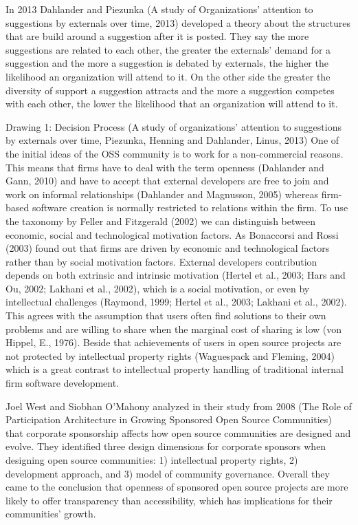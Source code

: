 In 2013 Dahlander and Piezunka (A study of Organizations’ attention to suggestions by externals over time, 2013) developed a theory about the structures that are build around a suggestion after it is posted. They say the more suggestions are related to each other, the greater the externals’ demand  for a suggestion and the more a suggestion is debated by externals, the higher the likelihood an organization will attend to it. On the other side the greater the diversity of support a suggestion attracts and the more a suggestion competes with each other, the lower the likelihood that an organization will attend to it.


Drawing 1: Decision Process (A study of organizations' attention to suggestions by externals over time, Piezunka, Henning and Dahlander, Linus, 2013)
One of the initial ideas of the OSS community is to work for a non-commercial reasons. This means that firms have to deal with the term openness (Dahlander and Gann, 2010) and have to accept that external developers are free to join and work on informal relationships (Dahlander and Magnusson, 2005) whereas firm-based software creation is normally restricted to relations within the firm. To use the taxonomy by Feller and Fitzgerald (2002) we can distinguish between economic, social and technological motivation factors. As Bonaccorsi and Rossi (2003) found out that firms are driven by economic and technological factors rather than by social motivation factors. External developers contribution depends on both extrinsic and intrinsic motivation (Hertel et al., 2003; Hars and Ou, 2002; Lakhani et al., 2002), which is a social motivation, or even by intellectual challenges (Raymond, 1999; Hertel et al., 2003; Lakhani et al., 2002).  This agrees with the assumption that users often find solutions to their own problems and are willing to share when the marginal cost of sharing is low (von Hippel, E., 1976). Beside that achievements of users in open source projects are not protected by intellectual property rights (Waguespack and Fleming, 2004) which is a great contrast to intellectual property handling of traditional internal firm software development.

Joel West and Siobhan O’Mahony analyzed in their study from 2008 (The Role of Participation Architecture in Growing Sponsored Open Source Communities) that corporate sponsorship affects how open source communities are designed and evolve. They identified three design dimensions for corporate sponsors when designing open source communities: 1) intellectual property rights, 2) development approach, and 3) model of community governance. Overall they came to the conclusion that openness of sponsored open source projects are more likely to offer transparency than accessibility, which has implications for their communities’ growth.

